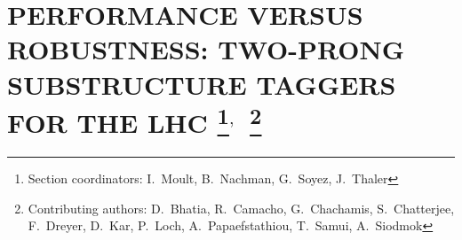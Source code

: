 \documentclass[11pt]{cernrep}
\begin{document}
%


\section{PERFORMANCE VERSUS ROBUSTNESS:  TWO-PRONG SUBSTRUCTURE TAGGERS FOR THE LHC \protect\footnote{Section coordinators:  I.~Moult, B.~Nachman, G.~Soyez, J.~Thaler}$^{,}$~\protect\footnote{Contributing authors: D.~Bhatia, R.~Camacho, G.~Chachamis, S.~Chatterjee, F.~Dreyer, D.~Kar, P.~Loch, A.~Papaefstathiou, T.~Samui, A.~Siodmok}}
\end{document}
